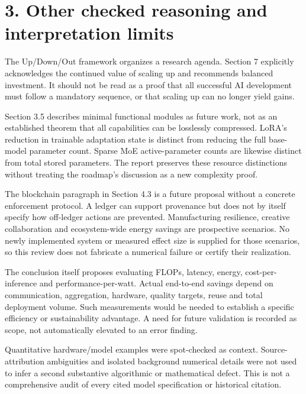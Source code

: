 \documentclass[10pt]{article}
\begin{document}
\section*{3. Other checked reasoning and interpretation limits}
The Up/Down/Out framework organizes a research agenda. Section 7 explicitly acknowledges the continued value of scaling up and recommends balanced investment. It should not be read as a proof that all successful AI development must follow a mandatory sequence, or that scaling up can no longer yield gains.\par
Section 3.5 describes minimal functional modules as future work, not as an established theorem that all capabilities can be losslessly compressed. LoRA’s reduction in trainable adaptation state is distinct from reducing the full base-model parameter count. Sparse MoE active-parameter counts are likewise distinct from total stored parameters. The report preserves these resource distinctions without treating the roadmap’s discussion as a new complexity proof.\par
The blockchain paragraph in Section 4.3 is a future proposal without a concrete enforcement protocol. A ledger can support provenance but does not by itself specify how off-ledger actions are prevented. Manufacturing resilience, creative collaboration and ecosystem-wide energy savings are prospective scenarios. No newly implemented system or measured effect size is supplied for those scenarios, so this review does not fabricate a numerical failure or certify their realization.\par
The conclusion itself proposes evaluating FLOPs, latency, energy, cost-per-inference and performance-per-watt. Actual end-to-end savings depend on communication, aggregation, hardware, quality targets, reuse and total deployment volume. Such measurements would be needed to establish a specific efficiency or sustainability advantage. A need for future validation is recorded as scope, not automatically elevated to an error finding.\par
Quantitative hardware/model examples were spot-checked as context. Source-attribution ambiguities and isolated background numerical details were not used to infer a second substantive algorithmic or mathematical defect. This is not a comprehensive audit of every cited model specification or historical citation.\par
\end{document}
